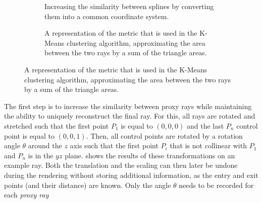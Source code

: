 \begin{figure}
\centering
\begin{subfigure}[b]{0.4\textwidth}
    \caption{Increasing the similarity between splines by converting them into a common coordinate system.}
    \label{contributions:fem:splines}
\end{subfigure}
\hspace{2cm}
\begin{subfigure}[b]{0.4\textwidth}
    \caption{A representation of the metric that is used in the K-Means clustering algorithm, approximating the area between the two rays by a sum of the triangle areas.}
    \label{contributions:fem:metric}
\end{subfigure}
\end{figure}

The first step is to increase the similarity between proxy rays while maintaining the ability to uniquely reconstruct the final ray.  For this, all rays are rotated and stretched such that the first point $P_1$ is equal to $(0,0,0)$ and the last $P_n$ control point is equal to $(0,0,1)$.  Then, all control points are rotated by a rotation angle $\theta$ around the $z$ axis such that the first point $P_i$ that is not collinear with $P_1$ and $P_n$ is in the $yz$ plane.   shows the results of these transformations on an example ray.  Both the translation and the scaling can then later be undone during the rendering without storing additional information, as the entry and exit points (and their distance) are known.  Only the angle $\theta$ needs to be recorded for each \emph{proxy ray}

